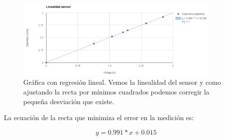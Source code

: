 \begin{figure}[H]
    \centering
    \includegraphics[width=0.9\textwidth]{images/sensor/linealidad_sensor.png}
    \caption[Gráfica con regresión lineal.]{Gráfica con regresión lineal. Vemos la linealidad del sensor y como ajustando la recta por mínimos cuadrados podemos corregir la pequeña desviación que existe.}
    \label{fig:sens_regre}
\end{figure}

La ecuación de la recta que minimiza el error en la medición es:

\begin{equation}
y= 0.991*x +0.015
\end{equation}